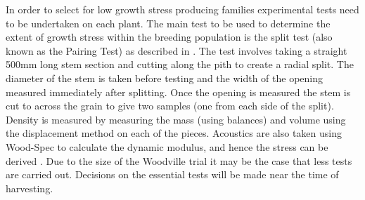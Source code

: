 In order to select for low growth stress producing families experimental tests
need to be undertaken on each plant. The main test to be used to determine the
extent of growth stress within the breeding population is the split test (also
known as the Pairing Test) as described in \cite{Chauhan_2010}. The test involves
taking a straight 500mm long stem section and cutting along the pith to create
a radial split. The diameter of the stem is taken before testing and the width
of the opening measured immediately after splitting. Once the opening is
measured the stem is cut to across the grain to give two samples (one from each
side of the split). Density is measured by measuring the mass (using balances)
and volume using the displacement method on each of the pieces. Acoustics are
also taken using Wood-Spec to calculate the dynamic modulus, and hence the
stress can be derived \cite{Chauhan_2010}. Due to the size of the Woodville trial it
may be the case that less tests are carried out. Decisions on the essential
tests will be made near the time of harvesting. 